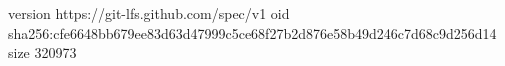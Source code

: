 version https://git-lfs.github.com/spec/v1
oid sha256:cfe6648bb679ee83d63d47999c5ce68f27b2d876e58b49d246c7d68c9d256d14
size 320973
